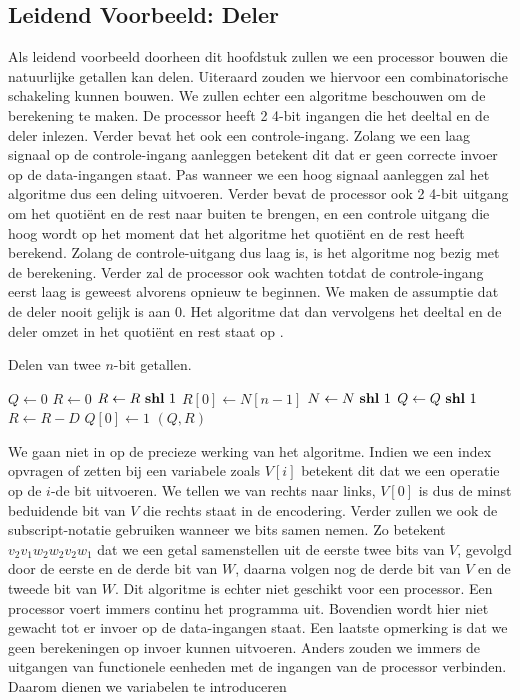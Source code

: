 \subsection{Leidend Voorbeeld: Deler}
Als leidend voorbeeld doorheen dit hoofdstuk zullen we een processor bouwen die natuurlijke getallen kan delen. Uiteraard zouden we hiervoor een combinatorische schakeling kunnen bouwen. We zullen echter een algoritme beschouwen om de berekening te maken. De processor heeft 2 4-bit ingangen die het deeltal en de deler inlezen. Verder bevat het ook een controle-ingang. Zolang we een laag signaal op de controle-ingang aanleggen betekent dit dat er geen correcte invoer op de data-ingangen staat. Pas wanneer we een hoog signaal aanleggen zal het algoritme dus een deling uitvoeren. Verder bevat de processor ook 2 4-bit uitgang om het quoti\"ent en de rest naar buiten te brengen, en een controle uitgang die hoog wordt op het moment dat het algoritme het quoti\"ent en de rest heeft berekend. Zolang de controle-uitgang dus laag is, is het algoritme nog bezig met de berekening. Verder zal de processor ook wachten totdat de controle-ingang eerst laag is geweest alvorens opnieuw te beginnen. We maken de assumptie dat
de deler nooit gelijk is aan 0. Het algoritme dat dan vervolgens het deeltal en de deler omzet in het quoti\"ent en rest staat op .
\begin{algorithm}[hbt]
\caption{Delen van twee $n$-bit getallen.}\label{alg:devisionFSMD}
\begin{algorithmic}[1]
\State $Q\gets 0$
\State $R\gets 0$
\State $R\gets R\mbox{ \textbf{shl} }{}1$
\State $R\left[0\right]\gets N\left[n-1\right]$
\State $N\gets N\mbox{ \textbf{shl} }{}1$
\State $Q\gets Q\mbox{ \textbf{shl} }{}1$
\State $R\gets R-D$
\State $Q\left[0\right]\gets 1$
\EndIf
\EndFor
\State \Return $\left(Q,R\right)$
\EndFunction
\end{algorithmic}
\end{algorithm}
We gaan niet in op de precieze werking van het algoritme. Indien we een index opvragen of zetten bij een variabele zoals $V\left[i\right]$ betekent dit dat we een operatie op de $i$-de bit uitvoeren. We tellen we van rechts naar links, $V[0]$ is dus de minst beduidende bit van $V$ die rechts staat in de encodering. Verder zullen we ook de subscript-notatie gebruiken wanneer we bits samen nemen. Zo betekent $v_2v_1w_2w_2v_2w_1$ dat we een getal samenstellen uit de eerste twee bits van $V$, gevolgd door de eerste en de derde bit van $W$, daarna volgen nog de derde bit van $V$ en de tweede bit van $W$. Dit algoritme is echter niet geschikt voor een processor. Een processor voert immers continu het programma uit. Bovendien wordt hier niet gewacht tot er invoer op de data-ingangen staat. Een laatste opmerking is dat we geen berekeningen op invoer kunnen uitvoeren. Anders zouden we immers de uitgangen van functionele eenheden met de ingangen van de processor verbinden. Daarom dienen we variabelen te introduceren
